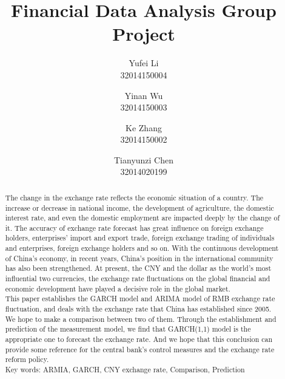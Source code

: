 \documentclass[12pt, a4paper, titlepage]{article}
\title{Financial Data Analysis Group Project\\
}
\author{Yufei Li  \\
	32014150004  \\
	\and 
	Yinan Wu \\
	32014150003 \\
	\and
	Ke Zhang\\
	32014150002\\
	\and
	Tianyunzi Chen\\
	32014020199
	}
\date{}
\begin{document}
\maketitle

\begin{abstract}
The change in the exchange rate reflects the economic situation of a country. The increase or decrease in national income, the development of agriculture, the domestic interest rate, and even the domestic employment are impacted deeply by the change of it. The accuracy of exchange rate forecast has great influence on foreign exchange holders, enterprises' import and export trade, foreign exchange trading of individuals and enterprises, foreign exchange holders and so on. With the continuous development of China's economy, in recent years, China's position in the international community has also been strengthened. At present, the CNY and the dollar as the world's most influential two currencies, the exchange rate fluctuations on the global financial and economic development have played a decisive role in the global market.\\

This paper establishes the GARCH model and ARIMA model of RMB exchange rate fluctuation, and deals with the exchange rate that China has established since 2005. We hope to make a comparison between two of them. Through the establishment and prediction of the measurement model, we find that GARCH(1,1) model is the appropriate one to forecast the exchange rate. And we hope that this conclusion can provide some reference for the central bank's control measures and the exchange rate reform policy.\\

Key words: ARMIA, GARCH, CNY exchange rate, Comparison, Prediction \\

\end{abstract}

\tableofcontents 
\newpage
\end{document}
